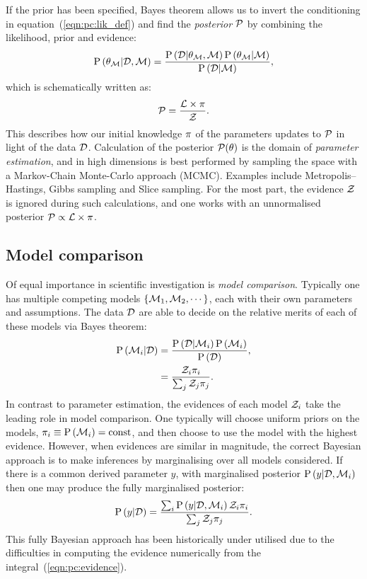 If the prior has been specified, Bayes theorem allows us to invert the conditioning in equation~(\ref{eqn:pc:lik_def}) and find the {\em posterior\/} $\mathcal{P}$ by combining the likelihood, prior and evidence:
%
\begin{equation}
  \mathrm{P}\left(\theta_{\mathcal{M}}\middle|\mathcal{D},\mathcal{M}\right) = \frac{\mathrm{P}\left(\mathcal{D}\middle|\theta_{\mathcal{M}},\mathcal{M}\right) \mathrm{P}\left(\theta_{\mathcal{M}}\middle|\mathcal{M}\right)}{\mathrm{P}\left(\mathcal{D}\middle|\mathcal{M}\right)},
  \label{eqn:pc:bayes_theorem}
\end{equation}
%
which is schematically written as:
\begin{equation}
  \mathcal{P} = \frac{\mathcal{L} \times \pi }{\mathcal{Z} }.
  \label{eqn:pc:bayes_theorem_abbrv}
\end{equation}
This describes how our initial knowledge $\pi$ of the parameters updates to $\mathcal{P}$ in light of the data $\mathcal{D}$.
Calculation of the posterior $\mathcal{P}(\theta)$ is the domain of {\em parameter estimation}, and in high dimensions is best performed by sampling the space with a Markov-Chain Monte-Carlo approach (MCMC). Examples include Metropolis--Hastings, Gibbs sampling and Slice sampling. For the most part, the evidence $\mathcal{Z}$ is ignored during such calculations, and one works with an unnormalised posterior ${\mathcal{P}\propto\mathcal{L}\times\pi}$.

\subsection{Model comparison}
\label{sec:pc:model_comp}

Of equal importance in scientific investigation is {\em model comparison}. Typically one has multiple competing models ${\{\mathcal{M}_1,\mathcal{M}_2,\cdots\}}$, each with their own parameters and assumptions. The data $\mathcal{D}$ are able to decide on the relative merits of each of these models via Bayes theorem:
\begin{align}
  \mathrm{P}\left(\mathcal{M}_i\middle|\mathcal{D}\right) &= \frac{\mathrm{P}\left(\mathcal{D}\middle|\mathcal{M}_i\right)\mathrm{P}\left(\mathcal{M}_i\right)}{\mathrm{P}\left(\mathcal{D}\right)}, \\
  &= \frac{\mathcal{Z}_i\pi_i}{\sum_j \mathcal{Z}_j\pi_j}.
\end{align}
In contrast to parameter estimation, the evidences of each model $\mathcal{Z}_i$ take the leading role in model comparison. One typically will choose uniform priors on the models, ${\pi_i\equiv\mathrm{P}\left(\mathcal{M}_i\right)= \mathrm{const}}$, and then choose to use the model with the highest evidence. However, when evidences are similar in magnitude, the correct Bayesian approach is to make inferences by marginalising over all models considered. If there is a common derived parameter $y$, with marginalised posterior $\mathrm{P}\left(y\middle|\mathcal{D},\mathcal{M}_i\right)$ then one may produce the fully marginalised posterior:
\begin{equation}
  \mathrm{P}\left(y\middle|\mathcal{D}\right) = \frac{\sum_i\mathrm{P}\left(y\middle|\mathcal{D},\mathcal{M}_i\right)\mathcal{Z}_i\pi_i}{\sum_j\mathcal{Z}_j\pi_j}.
\end{equation}
This fully Bayesian approach has been historically under utilised due to the difficulties in computing the evidence numerically from the integral~(\ref{eqn:pc:evidence}).



